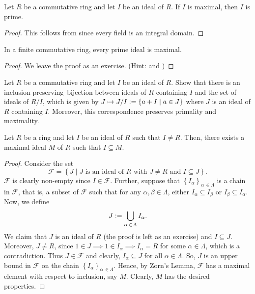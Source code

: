 \begin{cor} \label{cor:maximal-is-prime}
    Let $R$ be a commutative ring and let $I$ be an ideal of $R$. If $I$ is maximal, then $I$ is prime.
\end{cor}
\begin{proof}
    This follows from  since every field is an integral domain.
\end{proof}
\begin{prop} \label{prop:finite-prime-and-maximal}
    In a finite commutative ring, every prime ideal is maximal. 
\end{prop}
\begin{proof}
    We leave the proof as an exercise. (Hint:  and )
\end{proof}

\begin{exe}
    Let $R$ be a commutative ring and let $I$ be an ideal of $R$. Show that there is an inclusion-preserving\footnotemark\ bijection between ideals of $R$ containing $I$ and the set of ideals of $R/I$, which is given by $J \mapsto J/I \vcentcolon= \left\{ a + I \mid a \in J \right\}$ where $J$ is an ideal of $R$ containing $I$. Moreover, this correspondence preserves primality and maximality. 
\end{exe}

\begin{prop}
    Let $R$ be a ring and let $I$ be an ideal of $R$ such that $I \neq R$. Then, there exists a maximal ideal $M$ of $R$ such that $I \subseteq M$.
\end{prop}
\begin{proof}
    Consider the set 
    \[
        \mathcal{F} = \left\{ J \mid \text{$J$ is an ideal of $R$ with $J \neq R$ and $I \subseteq J$} \right\}.
    \]
    $\mathcal{F}$ is clearly non-empty since $I \in \mathcal{F}$. Further, suppose that $\left\{ I_{\alpha} \right\}_{\alpha \, \in \Lambda}$ is a chain in $\mathcal{F}$, that is, a subset of $\mathcal{F}$ such that for any $\alpha, \beta \in \Lambda$, either $I_{\alpha} \subseteq I_{\beta}$ or $I_{\beta} \subseteq I_{\alpha}$. Now, we define 
    \[
        J \vcentcolon= \bigcup_{\alpha \, \in \, \Lambda} I_{\alpha}.
    \]
    We claim that $J$ is an ideal of $R$ (the proof is left as an exercise) and $I \subseteq J$. Moreover, $J \neq R$, since $1 \in J \implies 1 \in I_{\alpha} \implies I_{\alpha} = R$ for some $\alpha \in \Lambda$, which is a contradiction. Thus $J \in \mathcal{F}$ and clearly, $I_{\alpha} \subseteq J$ for all $\alpha \in \Lambda$. So, $J$ is an upper bound in $\mathcal{F}$ on the chain $\left\{ I_{\alpha} \right\}_{\alpha \, \in \Lambda}$. Hence, by Zorn's Lemma, $\mathcal{F}$ has a maximal element with respect to inclusion, say $M$. Clearly, $M$ has the desired properties.
    
\end{proof}


